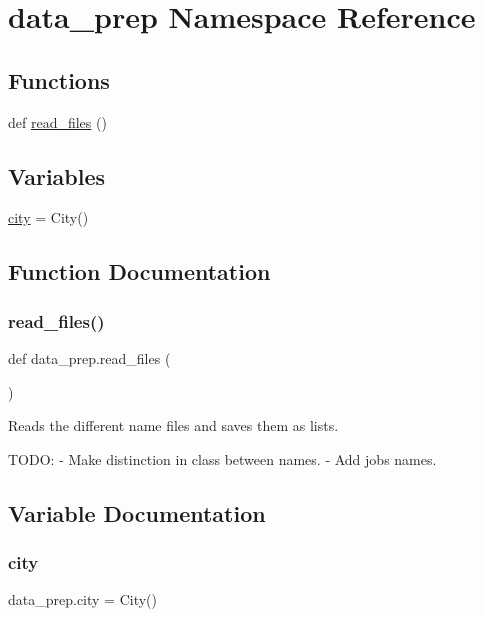 \hypertarget{namespacedata__prep}{}\section{data\+\_\+prep Namespace Reference}
\label{namespacedata__prep}
\subsection*{Functions}
\begin{DoxyCompactItemize}
\item 
def \hyperlink{namespacedata__prep_a6c1d8dd6090b7edc8f35b5b61ff316ff}{read\+\_\+files} ()
\end{DoxyCompactItemize}
\subsection*{Variables}
\begin{DoxyCompactItemize}
\item 
\hyperlink{namespacedata__prep_a8a2bcb1c7cd8c8572e8e652564b1d7a8}{city} = City()
\end{DoxyCompactItemize}


\subsection{Function Documentation}
\mbox{\label{namespacedata__prep_a6c1d8dd6090b7edc8f35b5b61ff316ff}} 
\subsubsection{\texorpdfstring{read\+\_\+files()}{read\_files()}}
{\footnotesize\ttfamily def data\+\_\+prep.\+read\+\_\+files (\begin{DoxyParamCaption}{ }\end{DoxyParamCaption})}

\begin{DoxyVerb}Reads the different name files and saves them as lists.

TODO:
- Make distinction in class between names.
- Add jobs names. 
\end{DoxyVerb}
 

\subsection{Variable Documentation}
\mbox{\label{namespacedata__prep_a8a2bcb1c7cd8c8572e8e652564b1d7a8}} 
\subsubsection{\texorpdfstring{city}{city}}
{\footnotesize\ttfamily data\+\_\+prep.\+city = City()}

